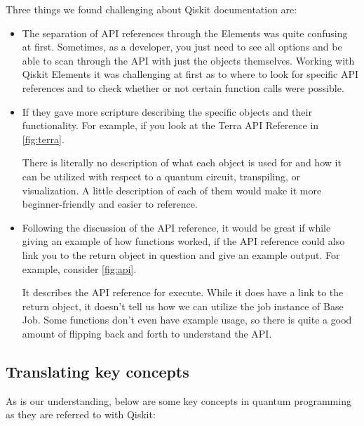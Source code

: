 \documentclass[12pt]{article}
\begin{document}
Three things we found challenging about Qiskit documentation are:
\begin{itemize}
    \item The separation of API references through the Elements was quite confusing at first. Sometimes, as a developer, you just need to see all options and be able to scan through the API with just the objects themselves. Working with Qiskit Elements it was challenging at first as to where to look for specific API references and to check whether or not certain function calls were possible.
    \item If they gave more scripture describing the specific objects and their functionality. For example, if you look at the Terra API Reference in \autoref{fig:terra}.

There is literally no description of what each object is used for and how it can be utilized with respect to a quantum circuit, transpiling, or visualization. A little description of each of them would make it more beginner-friendly and easier to reference.
    \item Following the discussion of the API reference, it would be great if while giving an example of how functions worked, if the API reference could also link you to the return object in question and give an example output.
	For example, consider \autoref{fig:api}.

    It describes the API reference for execute.
    While it does have a link to the return object, it doesn’t tell us how we can utilize the job instance of Base Job.
    Some functions don’t even have example usage, so there is quite a good amount of flipping back and forth to understand the API.

\end{itemize}



\subsection{Translating key concepts}

As is our understanding, below are some key concepts in quantum programming as they are referred to with Qiskit:
\end{document}
